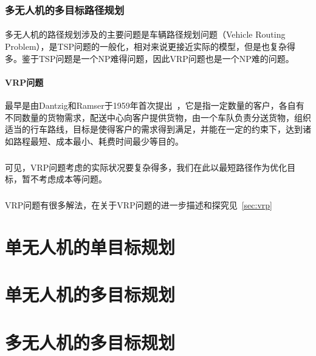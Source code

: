 \documentclass[UTF8,a4paper]{ctexart}
\begin{document}
\subsubsection{多无人机的多目标路径规划}
\paragraph{}多无人机的路径规划涉及的主要问题是车辆路径规划问题（Vehicle Routing Problem），是TSP问题的一般化，相对来说更接近实际的模型，但是也复杂得多。鉴于TSP问题是一个NP难得问题，因此VRP问题也是一个NP难的问题。

\paragraph{VRP问题}最早是由Dantzig和Ramser于1959年首次提出~\cite{dantzig1959truck}，它是指一定数量的客户，各自有不同数量的货物需求，配送中心向客户提供货物，由一个车队负责分送货物，组织适当的行车路线，目标是使得客户的需求得到满足，并能在一定的约束下，达到诸如路程最短、成本最小、耗费时间最少等目的。
\subparagraph{}可见，VRP问题考虑的实际状况要复杂得多，我们在此以最短路径作为优化目标，暂不考虑成本等问题。
\subparagraph{}VRP问题有很多解法，在关于VRP问题的进一步描述和探究见~\ref{sec:vrp}

\section{单无人机的单目标规划}

\section{单无人机的多目标规划}
\section{多无人机的多目标规划}

\newpage


\newpage
\end{document}
